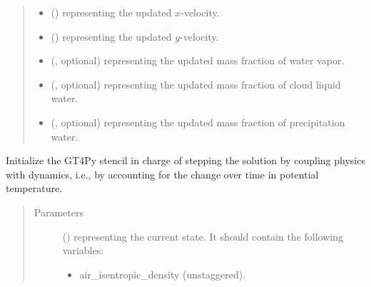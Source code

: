 \documentclass[letterpaper,10pt,english]{sphinxmanual}
\begin{document}
\begin{fulllineitems}
\begin{fulllineitems}
\begin{quote}
\begin{description}
\begin{itemize}
\item {} 
 () \textendash{}  representing the updated \(x\)-velocity.

\item {} 
 () \textendash{}  representing the updated \(y\)-velocity.

\item {} 
 (, optional) \textendash{}  representing the updated mass fraction of water vapor.

\item {} 
 (, optional) \textendash{}  representing the updated mass fraction of cloud liquid water.

\item {} 
 (, optional) \textendash{}  representing the updated mass fraction of precipitation water.

\end{itemize}


\end{description}\end{quote}

\end{fulllineitems}


\begin{fulllineitems}
\label{\detokenize{api:tasmania.dycore.prognostic_isentropic_nonconservative.PrognosticIsentropicNonconservative._stencil_stepping_by_coupling_physics_with_dynamics_initialize}}
Initialize the GT4Py stencil in charge of stepping the solution by coupling physics with dynamics,
i.e., by accounting for the change over time in potential temperature.
\begin{quote}\begin{description}
\item[{Parameters}] \leavevmode
{} () \textendash{} 
{\hyperref[\detokenize{api:tasmania.storages.state_isentropic.StateIsentropic}]{}} representing the current state.
It should contain the following variables:
\begin{itemize}
\item {} 
air\_isentropic\_density (unstaggered).


\end{itemize}
\end{description}
\end{quote}
\end{fulllineitems}
\end{fulllineitems}
\end{document}
